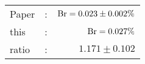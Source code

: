       \begin{tabular}{lcr}
          Paper &:& $\mathrm{Br}  = 0.023\pm 0.002\%$ \\
          this      &:& $\mathrm{Br}  = 0.027\%$ \\
		  ratio   &:& $1.171\pm 0.102$ \\
      \end{tabular}
